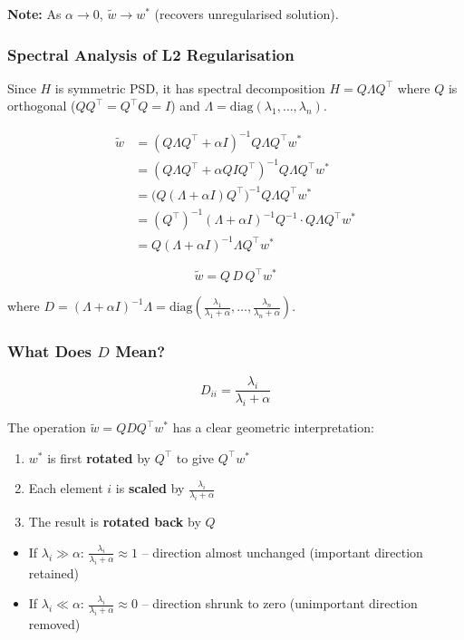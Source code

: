 \documentclass[12pt,a4paper]{article}
\begin{document}
\textbf{Note:} As $\alpha \to 0$, $\tilde{w} \to w^*$ (recovers unregularised solution).

\subsubsection{Spectral Analysis of L2 Regularisation}

Since $H$ is symmetric PSD, it has spectral decomposition $H = Q\Lambda Q^\top$ where $Q$ is orthogonal ($QQ^\top = Q^\top Q = I$) and $\Lambda = \mathrm{diag}(\lambda_1, \ldots, \lambda_n)$.

\begin{align*}
  \tilde{w}
  &= (Q\Lambda Q^\top + \alpha I)^{-1}Q\Lambda Q^\top w^*\\
  &= (Q\Lambda Q^\top + \alpha QIQ^\top)^{-1}Q\Lambda Q^\top w^*\\
  &= \bigl(Q(\Lambda + \alpha I)Q^\top\bigr)^{-1}Q\Lambda Q^\top w^*\\
  &= (Q^\top)^{-1}(\Lambda + \alpha I)^{-1}Q^{-1} \cdot Q\Lambda Q^\top w^*\\
  &= Q(\Lambda + \alpha I)^{-1}\Lambda Q^\top w^*
\end{align*}

\[
  \boxed{\tilde{w} = Q\,D\,Q^\top w^*}
\]

where $D = (\Lambda + \alpha I)^{-1}\Lambda = \mathrm{diag}\!\left(\frac{\lambda_1}{\lambda_1+\alpha},\ldots,\frac{\lambda_n}{\lambda_n+\alpha}\right)$.

\subsubsection{What Does $D$ Mean?}

\[
  D_{ii} = \frac{\lambda_i}{\lambda_i + \alpha}
\]

The operation $\tilde{w} = QDQ^\top w^*$ has a clear geometric interpretation:
\begin{enumerate}
  \item $w^*$ is first \textbf{rotated} by $Q^\top$ to give $Q^\top w^*$
  \item Each element $i$ is \textbf{scaled} by $\frac{\lambda_i}{\lambda_i + \alpha}$
  \item The result is \textbf{rotated back} by $Q$
\end{enumerate}

\begin{itemize}
  \item If $\lambda_i \gg \alpha$: $\frac{\lambda_i}{\lambda_i+\alpha} \approx 1$ -- direction almost unchanged (important direction retained)
  \item If $\lambda_i \ll \alpha$: $\frac{\lambda_i}{\lambda_i+\alpha} \approx 0$ -- direction shrunk to zero (unimportant direction removed)
\end{itemize}
\end{document}
